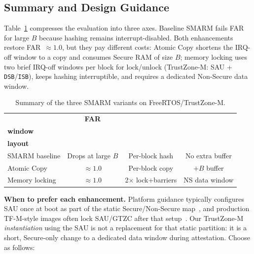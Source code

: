 \documentclass[conference]{IEEEtran}
\begin{document}
\subsection{Summary and Design Guidance}
\label{sec:guidance}

Table~\ref{tab:metric_summary} compresses the evaluation into three axes.
Baseline SMARM fails FAR for large $B$ because hashing remains
interrupt-disabled. Both enhancements restore FAR~$\approx 1.0$, but they
pay different costs: Atomic Copy shortens the IRQ-off window to a copy
and consumes Secure RAM of size $B$; memory locking uses two brief
IRQ-off windows per block for lock/unlock (TrustZone-M: SAU +
\texttt{DSB}/\texttt{ISB}), keeps hashing interruptible, and requires a
dedicated Non-Secure data window.

\begin{table}[H]
  \centering
  \footnotesize
  \caption{Summary of the three SMARM variants on FreeRTOS/TrustZone-M.}
  \label{tab:metric_summary}
  \setlength{\tabcolsep}{2.5pt}
  \renewcommand{\arraystretch}{1.12}
  \begin{tabular*}{\columnwidth}{@{\extracolsep{\fill}}lccc@{}}
    \toprule
    & \textbf{FAR} &
    \makecell{\textbf{IRQ-off}\\\textbf{window}} &
    \makecell{\textbf{RAM /}\\\textbf{layout}} \\
    \midrule
    SMARM baseline &
      Drops at large $B$ &
      Per-block hash &
      No extra buffer \\
    Atomic Copy &
      $\approx 1.0$ &
      Per-block copy &
      $+B$ buffer \\
    Memory locking &
      $\approx 1.0$ &
      2$\times$ lock+barriers &
      NS data window \\
    \bottomrule
  \end{tabular*}
\end{table}

\textbf{When to prefer each enhancement.}
Platform guidance typically configures SAU once at boot as part of the
static Secure/Non-Secure map~\cite{armv8m-arm,an5347,cmsis-tz,tfm-isolation},
and production TF-M-style images often lock SAU/GTZC after that
setup~\cite{um2851,tfm2024}. Our TrustZone-M \emph{instantiation} using the SAU is not a replacement
for that static partition: it is a short, Secure-only change to a
dedicated data window during attestation.
Choose as follows:
\end{document}
